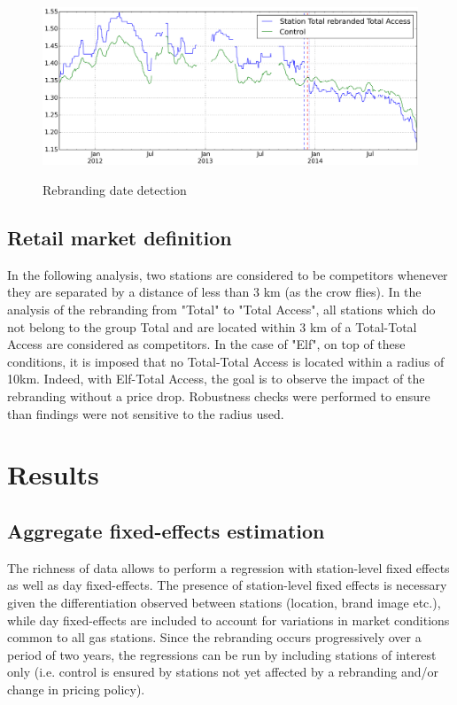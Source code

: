 \documentclass[11pt]{article}
\begin{document}
\begin{figure}[H]
    \caption{Rebranding date detection}
	\centering
		\includegraphics[width=15cm]{graphs/price_cut_detection_adj.png}
	\floatfoot{}
\label{figure:rebranding_detection}
\end{figure}

\subsection{Retail market definition}

In the following analysis, two stations are considered to be competitors whenever they are separated by a distance of less than 3 km (as the crow flies). In the analysis of the rebranding from "Total" to "Total Access", all stations which do not belong to the group Total and are located within 3 km of a Total-Total Access are considered as competitors. In the case of "Elf", on top of these conditions, it is imposed that no Total-Total Access is located within a radius of 10km. Indeed, with Elf-Total Access, the goal is to observe the impact of the rebranding without a price drop. Robustness checks were performed to ensure than findings were not sensitive to the radius used.

\section{Results}

\subsection{Aggregate fixed-effects estimation}

The richness of data allows to perform a regression with station-level fixed effects as well as day fixed-effects. The presence of station-level fixed effects is necessary given the differentiation observed between stations (location, brand image etc.), while day fixed-effects are included to account for variations in market conditions common to all gas stations. Since the rebranding occurs progressively over a period of two years, the regressions can be run by including stations of interest only (i.e. control is ensured by stations not yet affected by a rebranding and/or change in pricing policy).
\end{document}
